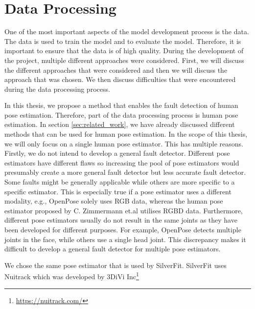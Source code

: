 \chapter{Data Processing}
\label{sec:data_processing}

One of the most important aspects of the model development process is the data. The data is used to train the model and to evaluate the model. Therefore, it is important to ensure that the data is of high quality. During the development of the project, multiple different approaches were considered. First, we will discuss the different approaches that were considered and then we will discuss the approach that was chosen. We then discuss difficulties that were encountered during the data processing process.

In this thesis, we propose a method that enables the fault detection of human pose estimation. Therefore, part of the data processing process is human pose estimation. In section \ref{sec:related_work}, we have already discussed different methods that can be used for human pose estimation. In the scope of this thesis, we will only focus on a single human pose estimator. This has multiple reasons. Firstly, we do not intend to develop a general fault detector. Different pose estimators have different flaws so increasing the pool of pose estimators would presumably create a more general fault detector but less accurate fault detector. Some faults might be generally applicable while others are more specific to a specific estimator. This is especially true if a pose estimator uses a different modality, e.g., OpenPose solely uses RGB data, whereas the human pose estimator proposed by C. Zimmermann et.al utilises RGBD data\cite{OpenPosePose, RGBDHPEforRoboticTaskLearning}. Furthermore, different pose estimators usually do not result in the same joints as they have been developed for different purposes. For example, OpenPose detects multiple joints in the face, while others use a single head joint. This discrepancy makes it difficult to develop a general fault detector for multiple pose estimators. 

We chose the same pose estimator that is used by SilverFit. SilverFit uses Nuitrack which was developed by 3DiVi Inc\footnote{\url{https://nuitrack.com/}}




